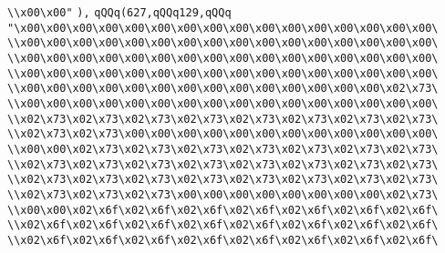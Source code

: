\verb|\\x00\x00"|\newline
\verb|),|\newline
\verb|qQQq(627,qQQq129,qQQq|\newline
\verb|"\x00\x00\x00\x00\x00\x00\x00\x00\x00\x00\x00\x00\x00\x00\x00\x00\|\newline
\verb|\\x00\x00\x00\x00\x00\x00\x00\x00\x00\x00\x00\x00\x00\x00\x00\x00\|\newline
\verb|\\x00\x00\x00\x00\x00\x00\x00\x00\x00\x00\x00\x00\x00\x00\x00\x00\|\newline
\verb|\\x00\x00\x00\x00\x00\x00\x00\x00\x00\x00\x00\x00\x00\x00\x00\x00\|\newline
\verb|\\x00\x00\x00\x00\x00\x00\x00\x00\x00\x00\x00\x00\x00\x00\x02\x73\|\newline
\verb|\\x00\x00\x00\x00\x00\x00\x00\x00\x00\x00\x00\x00\x00\x00\x00\x00\|\newline
\verb|\\x02\x73\x02\x73\x02\x73\x02\x73\x02\x73\x02\x73\x02\x73\x02\x73\|\newline
\verb|\\x02\x73\x02\x73\x00\x00\x00\x00\x00\x00\x00\x00\x00\x00\x00\x00\|\newline
\verb|\\x00\x00\x02\x73\x02\x73\x02\x73\x02\x73\x02\x73\x02\x73\x02\x73\|\newline
\verb|\\x02\x73\x02\x73\x02\x73\x02\x73\x02\x73\x02\x73\x02\x73\x02\x73\|\newline
\verb|\\x02\x73\x02\x73\x02\x73\x02\x73\x02\x73\x02\x73\x02\x73\x02\x73\|\newline
\verb|\\x02\x73\x02\x73\x02\x73\x00\x00\x00\x00\x00\x00\x00\x00\x02\x73\|\newline
\verb|\\x00\x00\x02\x6f\x02\x6f\x02\x6f\x02\x6f\x02\x6f\x02\x6f\x02\x6f\|\newline
\verb|\\x02\x6f\x02\x6f\x02\x6f\x02\x6f\x02\x6f\x02\x6f\x02\x6f\x02\x6f\|\newline
\verb|\\x02\x6f\x02\x6f\x02\x6f\x02\x6f\x02\x6f\x02\x6f\x02\x6f\x02\x6f\|\newline
